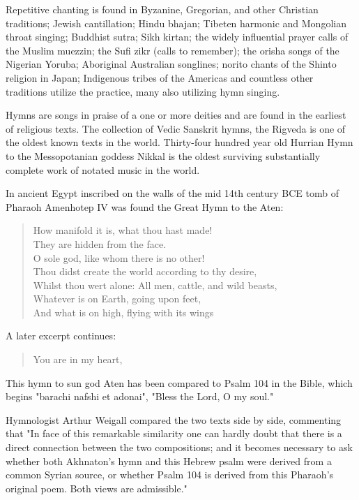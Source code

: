 \documentclass[12pt]{article}
\begin{document}
Repetitive chanting is found in Byzanine, Gregorian, and other Christian traditions; Jewish cantillation; Hindu bhajan; Tibeten harmonic and Mongolian throat singing; Buddhist sutra; Sikh kirtan; the widely influential prayer calls of the Muslim muezzin; the Sufi zikr (calls to remember); the orisha songs of the Nigerian Yoruba; Aboriginal Australian songlines; norito chants of the Shinto religion in Japan; Indigenous tribes of the Americas and countless other traditions utilize the practice, many also utilizing hymn singing.

Hymns are songs in praise of a one or more deities and are found in the earliest of religious texts. The collection of Vedic Sanskrit hymns, the Rigveda is one of the oldest known texts in the world. Thirty-four hundred year old Hurrian Hymn to the Messopotanian goddess Nikkal is the oldest surviving substantially complete work of notated music in the world.

In ancient Egypt inscribed on the walls of the mid 14th century BCE tomb of Pharaoh Amenhotep IV was found the Great Hymn to the Aten:

\begin{quote}
How manifold it is, what thou hast made! \\
They are hidden from the face. \\
O sole god, like whom there is no other! \\
Thou didst create the world according to thy desire, \\
Whilst thou wert alone: All men, cattle, and wild beasts, \\
Whatever is on Earth, going upon feet, \\
And what is on high, flying with its wings \\
\end{quote}

A later excerpt continues:

\begin{quote}
You are in my heart,
\end{quote}

This hymn to sun god Aten has been compared to Psalm 104 in the Bible, which begins "barachi nafshi et adonai", "Bless the Lord, O my soul."

Hymnologist Arthur Weigall compared the two texts side by side, commenting that "In face of this remarkable similarity one can hardly doubt that there is a direct connection between the two compositions; and it becomes necessary to ask whether both Akhnaton's hymn and this Hebrew psalm were derived from a common Syrian source, or whether Psalm 104 is derived from this Pharaoh's original poem. Both views are admissible."
\end{document}
